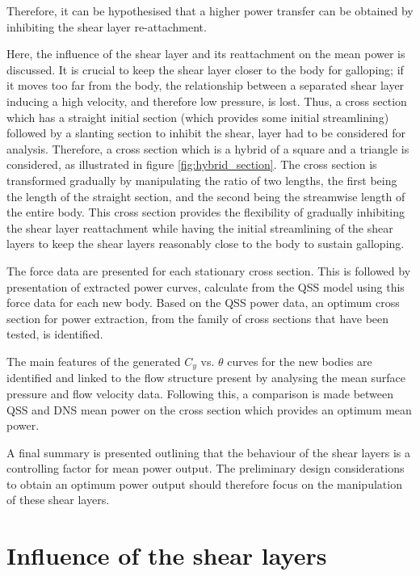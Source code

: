 Therefore, it can be hypothesised that a higher power transfer can be obtained by inhibiting the shear layer re-attachment. 

Here, the influence of the shear layer and its reattachment on the mean power is discussed. It is crucial to keep the shear layer closer to the body for galloping; if it moves too far from the body, the relationship between a separated shear layer inducing a high velocity, and therefore low pressure, is lost. Thus, a cross section which has a straight initial section (which provides some initial streamlining) followed by a slanting section to inhibit the shear, layer had to be considered for analysis. Therefore, a cross section which is a hybrid of a square and a triangle is considered, as illustrated in figure \ref{fig:hybrid_section}. The cross section is transformed gradually by manipulating the ratio of two lengths, the first being the length of the straight section, and the second being the streamwise length of the entire body. This cross section provides the flexibility of gradually inhibiting the shear layer reattachment while having the initial streamlining of the shear layers to keep the shear layers reasonably close to the body to sustain galloping. 

The force data are presented for each stationary cross section. This is followed by presentation of extracted power curves, calculate from the QSS model using this force data for each new body. Based on the QSS power data, an optimum cross section for power extraction, from the family of cross sections that have been tested, is identified.

The main features of the generated $C_y$ vs. $\theta$ curves for the
new bodies are identified and linked to the flow structure present by
analysing the mean surface pressure and flow velocity data. Following
this, a comparison is made between QSS and DNS mean power on the cross
section which provides an optimum mean power.

A final summary is presented outlining that the behaviour of the shear layers is a controlling factor for mean power output. The preliminary design considerations to obtain an optimum power output should therefore focus on the manipulation of these shear layers. 





\section{Influence of the shear layers}

